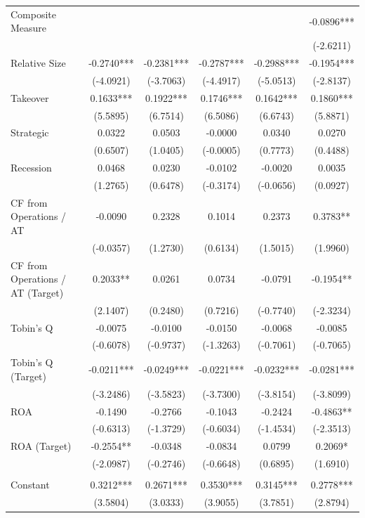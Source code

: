 \documentclass[12pt]{article}
\begin{document}
\begin{table}[!htbp]
\begin{adjustbox}{max width=\textwidth}
\begin{tabular}{lccccc}
			Composite Measure &  &  &  &  & -0.0896*** \\
			 &  &  &  &  & (-2.6211) \\
			Relative Size & -0.2740*** & -0.2381*** & -0.2787*** & -0.2988*** & -0.1954*** \\
			 & (-4.0921) & (-3.7063) & (-4.4917) & (-5.0513) & (-2.8137) \\
			Takeover & 0.1633*** & 0.1922*** & 0.1746*** & 0.1642*** & 0.1860*** \\
			 & (5.5895) & (6.7514) & (6.5086) & (6.6743) & (5.8871) \\
			Strategic & 0.0322 & 0.0503 & -0.0000 & 0.0340 & 0.0270 \\
			 & (0.6507) & (1.0405) & (-0.0005) & (0.7773) & (0.4488) \\
			Recession & 0.0468 & 0.0230 & -0.0102 & -0.0020 & 0.0035 \\
			 & (1.2765) & (0.6478) & (-0.3174) & (-0.0656) & (0.0927) \\
			CF from Operations / AT & -0.0090 & 0.2328 & 0.1014 & 0.2373 & 0.3783** \\
			 & (-0.0357) & (1.2730) & (0.6134) & (1.5015) & (1.9960) \\
			CF from Operations / AT (Target) & 0.2033** & 0.0261 & 0.0734 & -0.0791 & -0.1954** \\
			 & (2.1407) & (0.2480) & (0.7216) & (-0.7740) & (-2.3234) \\
			Tobin's Q & -0.0075 & -0.0100 & -0.0150 & -0.0068 & -0.0085 \\
			 & (-0.6078) & (-0.9737) & (-1.3263) & (-0.7061) & (-0.7065) \\
			Tobin's Q (Target) & -0.0211*** & -0.0249*** & -0.0221*** & -0.0232*** & -0.0281*** \\
			 & (-3.2486) & (-3.5823) & (-3.7300) & (-3.8154) & (-3.8099) \\
			ROA & -0.1490 & -0.2766 & -0.1043 & -0.2424 & -0.4863** \\
			 & (-0.6313) & (-1.3729) & (-0.6034) & (-1.4534) & (-2.3513) \\
			ROA (Target) & -0.2554** & -0.0348 & -0.0834 & 0.0799 & 0.2069* \\
			 & (-2.0987) & (-0.2746) & (-0.6648) & (0.6895) & (1.6910) \\
			 &  &  &  &  &  \\
			Constant & 0.3212*** & 0.2671*** & 0.3530*** & 0.3145*** & 0.2778*** \\
			 & (3.5804) & (3.0333) & (3.9055) & (3.7851) & (2.8794) \\

\end{tabular}
\end{adjustbox}
\end{table}
\end{document}

